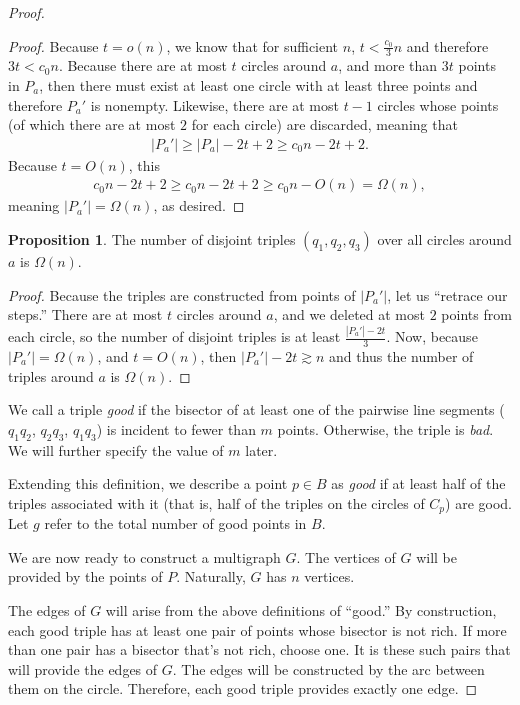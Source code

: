 \documentclass{scrippsthesisclass}
\theoremstyle{definition}
\newtheorem{proposition}[theorem]{Proposition}
\begin{document}
\begin{proof}
\begin{proof}
    Because $t = o(n)$, we know that for sufficient $n$, $t < \frac{c_0}{3}n$ and therefore $3t < c_0n$.
    Because there are at most $t$ circles around $a$, and more than $3t$ points in $P_a$, then there must exist at least one circle with at least three points and therefore $P_a'$ is nonempty. 
    Likewise, there are at most $t - 1$ circles whose points (of which there are at most $2$ for each circle) are discarded, meaning that 
    \begin{align}
        |P_a'| \geq |P_a| - 2t + 2 \geq c_0 n - 2t + 2.
    \end{align}
    Because $t = O(n)$, this 
    \begin{align}
        c_0 n - 2t + 2 \geq c_0n - 2t + 2 \geq c_0 n - O(n) = \Omega(n),
    \end{align}
    meaning $|P_a'| = \Omega(n)$, as desired.
\end{proof}

\begin{proposition}
    The number of disjoint triples $(q_1, q_2, q_3)$ over all circles around $a$ is $\Omega(n)$.
\end{proposition}
\begin{proof}
    Because the triples are constructed from points of $|P_a'|$, let us ``retrace our steps.''
    There are at most $t$ circles around $a$, and we deleted at most $2$ points from each circle, so the number of disjoint triples is at least $\frac{|P_a'| - 2t}{3}$. 
    Now, because $|P_a'| = \Omega(n)$, and $t = O(n)$, then $|P_a'| - 2t \gtrsim n$ and thus the number of triples around $a$ is $\Omega(n)$. 
\end{proof}

We call a triple \textit{good} if the bisector of at least one of the pairwise line segments ($q_1q_2$, $q_2q_3$, $q_1q_3$) is incident to fewer than $m$ points. 
Otherwise, the triple is \textit{bad}. We will further specify the value of $m$ later. 

Extending this definition, we describe a point $p \in B$ as \textit{good} if at least half of the triples associated with it (that is, half of the triples on the circles of $C_p$) are good. Let $g$ refer to the total number of good points in $B$. 

We are now ready to construct a multigraph $G$. 
The vertices of $G$ will be provided by the points of $P$. 
Naturally, $G$ has $n$ vertices.

The edges of $G$ will arise from the above definitions of ``good.''
By construction, each good triple has at least one pair of points whose bisector is not rich.
If more than one pair has a bisector that's not rich, choose one. 
It is these such pairs that will provide the edges of $G$.
The edges will be constructed by the arc between them on the circle. 
Therefore, each good triple provides exactly one edge. 


\end{proof}
\end{document}
